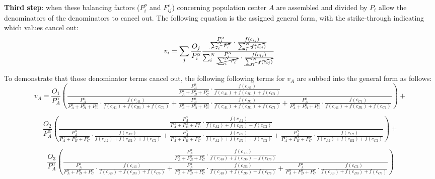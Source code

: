 \documentclass[10pt,letterpaper]{article}
\begin{document}
\begin{landscape}
\textbf{Third step}: when these balancing factors ($F^p_{i}$ and $F^c_{ij}$) concerning population center $A$ are assembled and divided by $P_i$ allow the denominators of the denominators to cancel out. The following equation is the assigned general form, with the strike-through indicating which values cancel out:
$$
v_{i} = \sum_{j}\frac{O_j}{P_{i }^\alpha}\frac{\frac{P_{i}^\alpha}{\cancel{\sum_{i}^N P_{i}^\alpha}} \cdot \frac{f(c_{ij})}{\cancel{\sum_{i}^N f(c_{ij})}}}{\sum_{i}^N \frac{P_{i}^\alpha}{\cancel{\sum_{i}^N P_{i}^\alpha}} \cdot \frac{f(c_{ij})}{\cancel{\sum_{i}^N f(c_{ij})}}}\
$$

To demonstrate that those denominator terms cancel out, the following following terms for $v_A$ are subbed into the general form as follows:
$$
v_{A} = \frac{O_1}{P_{A}^\alpha}(\frac{\frac{P_{A}^\alpha}{P_{A}^\alpha+P_{B}^\alpha+P_{C}^\alpha} \cdot \frac{f(c_{A1})}{f(c_{A1})+f(c_{B1})+f(c_{C1})}}{\frac{P_{A}^\alpha}{P_{A}^\alpha+P_{B}^\alpha+P_{C}^\alpha} \cdot \frac{f(c_{A1})}{f(c_{A1})+f(c_{B1})+f(c_{C1})} + \frac{P_{A}^\alpha}{P_{A}^\alpha+P_{B}^\alpha+P_{C}^\alpha} \cdot \frac{f(c_{B1})}{f(c_{A1})+f(c_{B1})+f(c_{C1})}+ \frac{P_{A}^\alpha}{P_{A}^\alpha+P_{B}^\alpha+P_{C}^\alpha} \cdot \frac{f(c_{C1})}{f(c_{A1})+f(c_{B1})+f(c_{C1})}}) +
$$

$$
\frac{O_2}{P_{A}^\alpha}(\frac{\frac{P_{A}^\alpha}{P_{A}^\alpha+P_{B}^\alpha+P_{C}^\alpha} \cdot \frac{f(c_{A2})}{f(c_{A2})+f(c_{B2})+f(c_{C2})}}{\frac{P_{A}^\alpha}{P_{A}^\alpha+P_{B}^\alpha+P_{C}^\alpha} \cdot \frac{f(c_{A2})}{f(c_{A2})+f(c_{B2})+f(c_{C2})} + \frac{P_{A}^\alpha}{P_{A}^\alpha+P_{B}^\alpha+P_{C}^\alpha} \cdot \frac{f(c_{B2})}{f(c_{A2})+f(c_{B2})+f(c_{C2})}+\frac{P_{A}^\alpha}{P_{A}^\alpha+P_{B}^\alpha+P_{C}^\alpha} \cdot \frac{f(c_{C2})}{f(c_{A2})+f(c_{B2})+f(c_{C2})}} )+
$$

$$
\frac{O_3}{P_{A}^\alpha}(\frac{\frac{P_{A}^\alpha}{P_{A}^\alpha+P_{B}^\alpha+P_{C}^\alpha} \cdot \frac{f(c_{A3})}{f(c_{A3})+f(c_{B3})+f(c_{C3})}}{\frac{P_{A}^\alpha}{P_{A}^\alpha+P_{B}^\alpha+P_{C}^\alpha} \cdot \frac{f(c_{A3})}{f(c_{A3})+f(c_{B3})+f(c_{C3})} + \frac{P_{A}^\alpha}{P_{A}^\alpha+P_{B}^\alpha+P_{C}^\alpha} \cdot \frac{f(c_{B3})}{f(c_{A3})+f(c_{B3})+f(c_{C3})}+\frac{P_{A}^\alpha}{P_{A}^\alpha+P_{B}^\alpha+P_{C}^\alpha} \cdot \frac{f(c_{C3})}{f(c_{A3})+f(c_{B3})+f(c_{C3})}} )
$$


\end{landscape}
\end{document}
